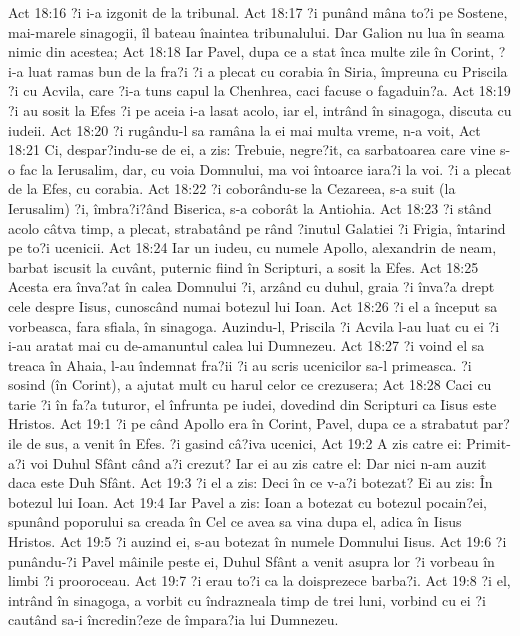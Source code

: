 Act 18:16  ?i i-a izgonit de la tribunal.
Act 18:17  ?i punând mâna to?i pe Sostene, mai-marele sinagogii, îl bateau înaintea tribunalului. Dar Galion nu lua în seama nimic din acestea;
Act 18:18  Iar Pavel, dupa ce a stat înca multe zile în Corint, ?i-a luat ramas bun de la fra?i ?i a plecat cu corabia în Siria, împreuna cu Priscila ?i cu Acvila, care ?i-a tuns capul la Chenhrea, caci facuse o fagaduin?a.
Act 18:19  ?i au sosit la Efes ?i pe aceia i-a lasat acolo, iar el, intrând în sinagoga, discuta cu iudeii.
Act 18:20  ?i rugându-l sa ramâna la ei mai multa vreme, n-a voit,
Act 18:21  Ci, despar?indu-se de ei, a zis: Trebuie, negre?it, ca sarbatoarea care vine s-o fac la Ierusalim, dar, cu voia Domnului, ma voi întoarce iara?i la voi. ?i a plecat de la Efes, cu corabia.
Act 18:22  ?i coborându-se la Cezareea, s-a suit (la Ierusalim) ?i, îmbra?i?ând Biserica, s-a coborât la Antiohia.
Act 18:23  ?i stând acolo câtva timp, a plecat, strabatând pe rând ?inutul Galatiei ?i Frigia, întarind pe to?i ucenicii.
Act 18:24  Iar un iudeu, cu numele Apollo, alexandrin de neam, barbat iscusit la cuvânt, puternic fiind în Scripturi, a sosit la Efes.
Act 18:25  Acesta era înva?at în calea Domnului ?i, arzând cu duhul, graia ?i înva?a drept cele despre Iisus, cunoscând numai botezul lui Ioan.
Act 18:26  ?i el a început sa vorbeasca, fara sfiala, în sinagoga. Auzindu-l, Priscila ?i Acvila l-au luat cu ei ?i i-au aratat mai cu de-amanuntul calea lui Dumnezeu.
Act 18:27  ?i voind el sa treaca în Ahaia, l-au îndemnat fra?ii ?i au scris ucenicilor sa-l primeasca. ?i sosind (în Corint), a ajutat mult cu harul celor ce crezusera;
Act 18:28  Caci cu tarie ?i în fa?a tuturor, el înfrunta pe iudei, dovedind din Scripturi ca Iisus este Hristos.
Act 19:1  ?i pe când Apollo era în Corint, Pavel, dupa ce a strabatut par?ile de sus, a venit în Efes. ?i gasind câ?iva ucenici,
Act 19:2  A zis catre ei: Primit-a?i voi Duhul Sfânt când a?i crezut? Iar ei au zis catre el: Dar nici n-am auzit daca este Duh Sfânt.
Act 19:3  ?i el a zis: Deci în ce v-a?i botezat? Ei au zis: În botezul lui Ioan.
Act 19:4  Iar Pavel a zis: Ioan a botezat cu botezul pocain?ei, spunând poporului sa creada în Cel ce avea sa vina dupa el, adica în Iisus Hristos.
Act 19:5  ?i auzind ei, s-au botezat în numele Domnului Iisus.
Act 19:6  ?i punându-?i Pavel mâinile peste ei, Duhul Sfânt a venit asupra lor ?i vorbeau în limbi ?i prooroceau.
Act 19:7  ?i erau to?i ca la doisprezece barba?i.
Act 19:8  ?i el, intrând în sinagoga, a vorbit cu îndrazneala timp de trei luni, vorbind cu ei ?i cautând sa-i încredin?eze de împara?ia lui Dumnezeu.
